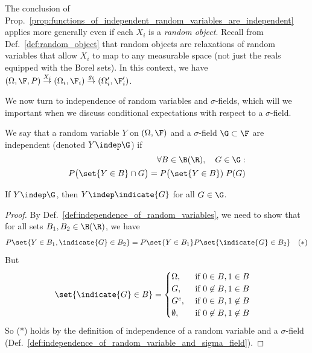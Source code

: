 \documentclass{article} %
\begin{document}
\begin{remark}{}
The conclusion of Prop.~\ref{prop:functions_of_independent_random_variables_are_independent} applies more generally even if each $X_i$ is a  \textit{random object}.  Recall from Def.~\ref{def:random_object} that random objects are relaxations of random variables that allow $X_i$ to map to any measurable space (not just the reals equipped with the Borel sets).  In this context, we have $(\Omega, \F, P) \stackrel{X_i}{\to} (\Omega_i, \F_i) \stackrel{g_i}{\to} (\Omega_i', \F_i')$.
\end{remark}

We now turn to independence of random variables and $\sigma$-fields, which will we important when we discuss conditional expectations with respect to a $\sigma$-field.

\begin{definition}
We say that a random variable $Y$ on $(\Omega, \F)$ and a $\sigma$-field $\G \subset \F$ are independent (denoted $Y \indep \G$) if 
\begin{align*}
\forall B \in \B(\R), \quad G \in \G: & \\
P\big(\set{Y \in B} \cap G \big) = P\big(\set{Y \in B}) \; P(G)
\end{align*}
\label{def:independence_of_random_variable_and_sigma_field}
\end{definition}

\begin{proposition}
If $Y \indep \G$, then $Y \indep \indicate{G}$ \; for all $G \in \G$.
\label{prop:a_random_variable_is_independent_from_an_indicator_for_any_set_belonging_to_a_sigma_field_that_is_independent_from_the_random_variable}
\end{proposition}

\begin{proof}
By Def.~\ref{def:independence_of_random_variables}, we need to show that for all sets $B_1, B_2 \in \B(\R)$, we have 
\begin{align*}
P\set{Y \in B_1, \indicate{G} \in B_2} = P\set{Y \in B_1} P\set{\indicate{G} \in B_2} && (*)
\end{align*}	
But
\begin{align*}
\set{\indicate{G} \in B} &= 
\begin{cases}
\Omega, & \text{ if } 0 \in B, 1 \in B \\	
G, & \text{ if } 0 \not\in B, 1 \in B \\	
G^c, & \text{ if } 0 \in B, 1 \not\in B \\	
\emptyset, & \text{ if } 0 \not\in B, 1 \not\in B 
\end{cases}
\end{align*}
So (*) holds by the definition of independence of a random variable and a $\sigma$-field (Def.~\ref{def:independence_of_random_variable_and_sigma_field}).
\end{proof}
\end{document}
